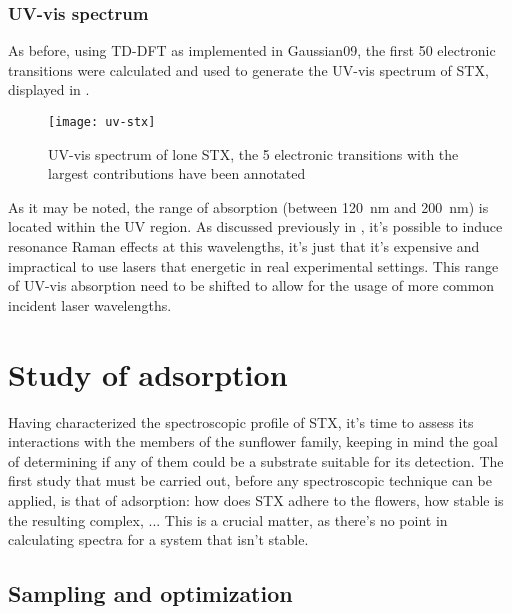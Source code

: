 \subsubsection{UV-vis spectrum}
As before, using TD-DFT as implemented in Gaussian09, the first 50 electronic transitions were calculated and used to generate the UV-vis spectrum of STX, displayed in .

\begin{figure}
    \texttt{[image: uv-stx]}
    \caption[UV-vis spectrum of lone STX]{UV-vis spectrum of lone STX, the 5 electronic transitions with the largest contributions have been annotated}
\end{figure}

As it may be noted, the range of absorption (between \SI{120}{\nano\metre} and \SI{200}{\nano\metre}) is located within the UV region.
As discussed previously in , it's possible to induce resonance Raman effects at this wavelengths, it's just that it's expensive and impractical to use lasers that energetic in real experimental settings.
This range of UV-vis absorption need to be shifted to allow for the usage of more common incident laser wavelengths.

\section{Study of adsorption}

Having characterized the spectroscopic profile of STX, it's time to assess its interactions with the members of the sunflower family, keeping in mind the goal of determining if any of them could be a substrate suitable for its detection.
The first study that must be carried out, before any spectroscopic technique can be applied, is that of adsorption: how does STX adhere to the flowers, how stable is the resulting complex, ...
This is a crucial matter, as there's no point in calculating spectra for a system that isn't stable.

\subsection{Sampling and optimization}

